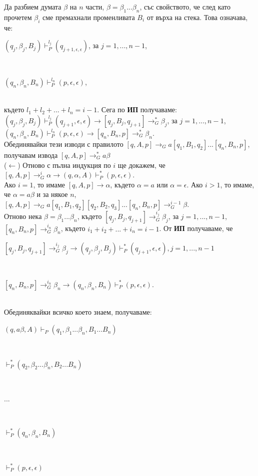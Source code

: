 \documentclass[11pt]{article}
\begin{document}
Да разбием думата $\beta$ на $n$ части, $\beta = \beta_{1}...\beta_{n}$, със свойството, че след като прочетем $\beta_{i}$ сме премахнали променливата $B_{i}$ от върха на стека. Това означава, че: \\
\centerline{$(q_{j}, \beta_{j}, B_{j}) \vdash^{l_j}_{P}(q_{j+1, \epsilon, \epsilon})$, за $j = 1, ..., n-1$,}\\
\centerline{$(q_{n}, \beta_{n}, B_{n}) \vdash^{l_n}_{P}(p, \epsilon, \epsilon)$,}\\
където $l_{1} + l_{2} + ... + l_{n} = i - 1$. Сега по \textbf{ИП} получаваме:\\
$(q_{j}, \beta_{j}, B_{j})\vdash^{l_j}_{P}(q_{j+1}, \epsilon, \epsilon) \rightarrow [q_{j}, B_{j}, q_{j+1}] \to^{*}_{G}\beta_{j}$, за $j = 1, ..., n - 1$, \\
$(q_{n}, \beta_{n}, B_{n})\vdash^{l_n}_{P}(p, \epsilon, \epsilon) \rightarrow [q_{n}, B_{n},p] \to^{*}_{G}\beta_{n}$.\\
Обединявайки тези изводи с правилото $[q, A, p] \to_{G} a[q_{1}, B_{1}, q_{2}]...[q_{n}, B_{n}, p]$, получавам извода $[q, A, p] \to ^{*}_{G} a \beta$\\ 

($\leftarrow$) Отново с пълна индукция по $i$ ще докажем, че $[q, A,p] \to^{i}_{G}\alpha \rightarrow (q, \alpha, A) \vdash^{*}_{P} (p, \epsilon, \epsilon) $.\\

Ако $i = 1$, то имаме $[q, A, p] \to \alpha$, където $\alpha = a$ или $\alpha = \epsilon$. Ако $i > 1$, то имаме, че $\alpha = a \beta$ и за някое $n$, $[q, A, p] \to_{G} a[q_{1}, B_{1}, q_{2}][q_{2}, B_{2}, q_{3}]...[q_{n}, B_{n}, p] \to^{i-1}_{G} \beta$.\\

Отново нека $\beta = \beta_{1}...\beta_{n}$, където $[q_{j}, B_{j}, q_{j+1}] \to ^{i_j}_{G} \beta_{j}$, за $j = 1, ..., n-1$,\\
$[q_{n}, B_{n}, p] \to ^{i_n}_{G} \beta_{n}$, където $i_{1} + i_{2} + ... + i_{n} = i - 1$. От \textbf{ИП} получаваме, че \\
\centerline{$[q_{j}, B_{j}, q_{j+1}] \to ^{i_j}_{G} \beta_{j} \rightarrow (q_{j}, \beta_{j}, B_{j}) \vdash^{*}_{P}(q_{j+1}, \epsilon, \epsilon), j = 1, ..., n - 1$}\\
\centerline{$[q_{n}, B_{n}, p] \to ^{i_n}_{G}\beta_{n} \rightarrow (q_{n}, \beta_{n}, B_{n}) \vdash^{*}_{P}(p, \epsilon, \epsilon)$.}\\

Обединяквайки всичко което знаем, получаваме: \\
\centerline{$(q, a \beta, A)\vdash_{P}(q_{1}, \beta_{1}...\beta_{n}, B_{1}...B_{n})$}\\
\centerline{$\vdash^{*}_{P}(q_{2}, \beta_{2}...\beta_{n}, B_{2}...B_{n})$}\\
\centerline{...}\\
\centerline{$\vdash^{*}_{P}(q_{n}, \beta_{n}, B_{n})$}\\
\centerline{$\vdash^{*}_{P}(p, \epsilon, \epsilon)$}\par
\end{document}
